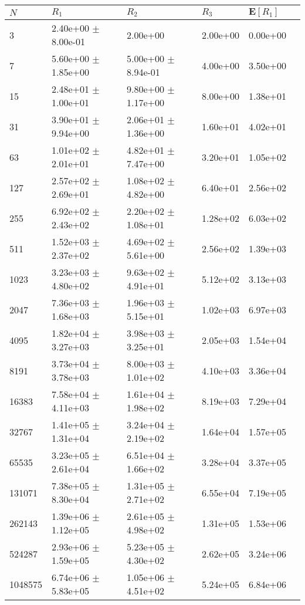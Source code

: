 \documentclass{tufte-handout}
\begin{document}
\medskip\noindent
\begin{tabular}{ l l l l l l }
\toprule
 { $N$ } & { $R_1$ } & {$R_2$} & {$R_3$} & {$\mathbf E[R_1]$}\\\midrule
3 & 2.40e+00 $\pm$ 8.00e-01 & 2.00e+00 & 2.00e+00 & 0.00e+00 & \\
7 & 5.60e+00 $\pm$ 1.85e+00 & 5.00e+00 $\pm$ 8.94e-01 & 4.00e+00 & 3.50e+00 & \\
15 & 2.48e+01 $\pm$ 1.00e+01 & 9.80e+00 $\pm$ 1.17e+00 & 8.00e+00 & 1.38e+01 & \\
31 & 3.90e+01 $\pm$ 9.94e+00 & 2.06e+01 $\pm$ 1.36e+00 & 1.60e+01 & 4.02e+01 & \\
63 & 1.01e+02 $\pm$ 2.01e+01 & 4.82e+01 $\pm$ 7.47e+00 & 3.20e+01 & 1.05e+02 & \\
127 & 2.57e+02 $\pm$ 2.69e+01 & 1.08e+02 $\pm$ 4.82e+00 & 6.40e+01 & 2.56e+02 & \\
255 & 6.92e+02 $\pm$ 2.43e+02 & 2.20e+02 $\pm$ 1.08e+01 & 1.28e+02 & 6.03e+02 & \\
511 & 1.52e+03 $\pm$ 2.37e+02 & 4.69e+02 $\pm$ 5.61e+00 & 2.56e+02 & 1.39e+03 & \\
1023 & 3.23e+03 $\pm$ 4.80e+02 & 9.63e+02 $\pm$ 4.91e+01 & 5.12e+02 & 3.13e+03 & \\
2047 & 7.36e+03 $\pm$ 1.68e+03 & 1.96e+03 $\pm$ 5.15e+01 & 1.02e+03 & 6.97e+03 & \\
4095 & 1.82e+04 $\pm$ 3.27e+03 & 3.98e+03 $\pm$ 3.25e+01 & 2.05e+03 & 1.54e+04 & \\
8191 & 3.73e+04 $\pm$ 3.78e+03 & 8.00e+03 $\pm$ 1.01e+02 & 4.10e+03 & 3.36e+04 & \\
16383 & 7.58e+04 $\pm$ 4.11e+03 & 1.61e+04 $\pm$ 1.98e+02 & 8.19e+03 & 7.29e+04 & \\
32767 & 1.41e+05 $\pm$ 1.31e+04 & 3.24e+04 $\pm$ 2.19e+02 & 1.64e+04 & 1.57e+05 & \\
65535 & 3.23e+05 $\pm$ 2.61e+04 & 6.51e+04 $\pm$ 1.66e+02 & 3.28e+04 & 3.37e+05 & \\
131071 & 7.38e+05 $\pm$ 8.30e+04 & 1.31e+05 $\pm$ 2.71e+02 & 6.55e+04 & 7.19e+05 & \\
262143 & 1.39e+06 $\pm$ 1.12e+05 & 2.61e+05 $\pm$ 4.98e+02 & 1.31e+05 & 1.53e+06 & \\
524287 & 2.93e+06 $\pm$ 1.59e+05 & 5.23e+05 $\pm$ 4.30e+02 & 2.62e+05 & 3.24e+06 & \\
1048575 & 6.74e+06 $\pm$ 5.83e+05 & 1.05e+06 $\pm$ 4.51e+02 & 5.24e+05 & 6.84e+06 & \\

\bottomrule
\end{tabular}
\end{document}
